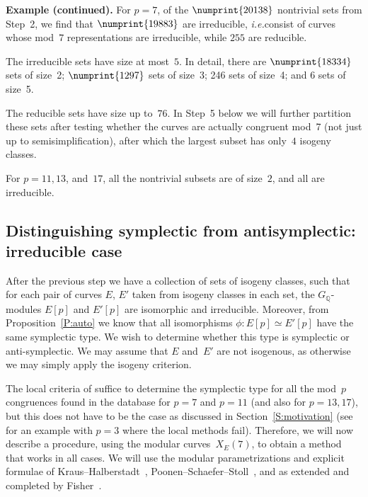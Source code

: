 \documentclass[12pt]{amsart}
\newcommand{\Q}{\mathbb{Q}}
\numberwithin{equation}{section}
\theoremstyle{definition}
\theoremstyle{remark}
\begin{document}
{\bf Example (continued).} For $p=7$, of the $\numprint{20138}$
nontrivial sets from Step~2, we find that $\numprint{19883}$ are
irreducible, {\it i.e.}\@ consist of curves whose mod~$7$
representations are irreducible, while $255$ are reducible.

The irreducible sets have size at most~$5$.  In detail, there are
$\numprint{18334}$ sets of size~2; $\numprint{1297}$ sets of size~3;
246 sets of size~4; and 6 sets of size~5.

The reducible sets have size up to~$76$.  In Step~5 below we will
further partition these sets after testing whether the curves are
actually congruent mod~7 (not just up to semisimplification), after
which the largest subset has only~$4$ isogeny classes.


For $p=11, 13$, and~$17$, all the nontrivial subsets are of size~$2$,
and all are irreducible.

\subsection{Distinguishing symplectic from antisymplectic: irreducible case}
After the previous step we have a collection of sets of isogeny
classes, such that for each pair of curves $E$, $E'$ taken from
isogeny classes in each set, the $G_{\Q}$-modules $E[p]$ and $E'[p]$
are isomorphic and irreducible. Moreover, from
Proposition~\ref{P:auto} we know that all isomorphisms $\phi : E[p]
\simeq E'[p]$ have the same symplectic type. We wish to determine
whether this type is symplectic or anti-symplectic.  We may assume
that $E$ and~$E'$ are not isogenous, as otherwise we may simply apply
the isogeny criterion.

The local criteria of \cite{FKSym} suffice to determine the symplectic
type for all the mod~$p$ congruences found in the database for $p=7$
and $p=11$ (and also for $p=13, 17$), but this does not have to be
the case as discussed in Section~\ref{S:motivation} (see
\cite[Proposition~16]{FKSym} for an example with $p=3$ where the local
methods fail).  Therefore, we will now describe a procedure, using the
modular curves~$X_E(7)$, to obtain a method that works in all cases.
We will use the modular parametrizations and explicit formulae of
Kraus--Halberstadt~\cite{Halberstadt-Kraus-XE7},
Poonen--Schaefer--Stoll~\cite{PSS}, and as extended and completed by
Fisher~\cite{Fisher}.
\end{document}
